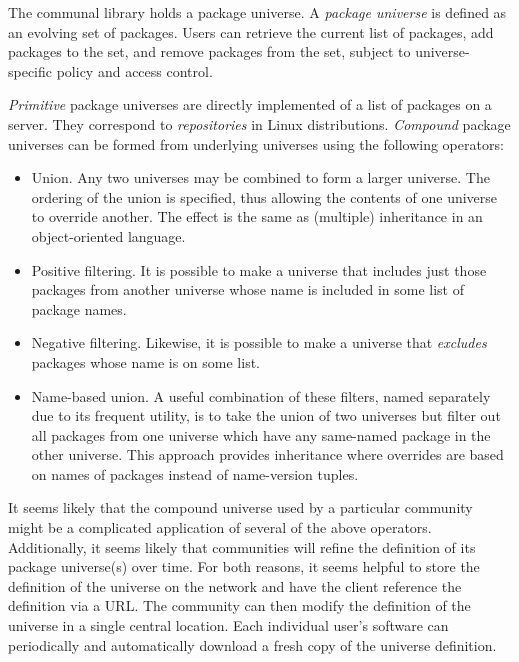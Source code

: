 \documentclass{article}
\begin{document}
The communal library holds a package universe.  A \emph{package
universe} is defined as an evolving set of packages.  Users can
retrieve the current list of packages, add packages to the set, and
remove packages from the set, subject to universe-specific policy and
access control.

\emph{Primitive} package universes are directly implemented of a list
of packages on a server.  They correspond to \emph{repositories} in
Linux distributions.  \emph{Compound} package universes can be
formed from underlying universes using the following operators:
\begin{itemize}
\item Union.  Any two universes may be combined to form a larger
      universe.  The ordering of the union is specified, thus allowing
      the contents of one universe to override another.  The effect
      is the same as (multiple) inheritance in an object-oriented language.

\item Positive filtering.  It is possible to make a universe that
      includes just those packages from another universe whose
      name is included in some list of package names.

\item Negative filtering.  Likewise, it is possible to make a universe
      that \emph{excludes} packages whose name is on some list.

\item Name-based union.  A useful combination of these filters, named
      separately due to its frequent utility, is to take the union of
      two universes but filter out all packages from one universe
      which have any same-named package in the other universe.  This
      approach provides inheritance where overrides are based on names
      of packages instead of name-version tuples.
\end{itemize}


It seems likely that the compound universe used by a particular
community might be a complicated application of several of the above
operators.  Additionally, it seems likely that communities will refine
the definition of its package universe(s) over time.  For both
reasons, it seems helpful to store the definition of the universe on
the network and have the client reference the definition via a URL.
The community can then modify the definition of the universe in a
single central location.  Each individual user's software can
periodically and automatically download a fresh copy of the universe
definition.
\end{document}
